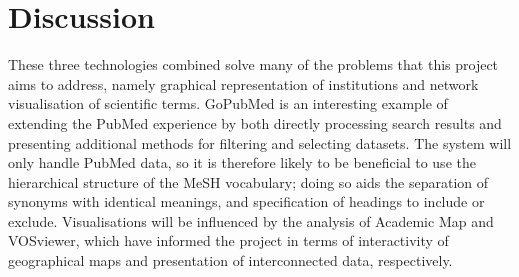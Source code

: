 \documentclass[PROP_AGutteridge_CS.tex]{subfiles}
\begin{document}
\section{Discussion}
These three technologies combined solve many of the problems that this project aims to address, namely graphical representation of institutions and network visualisation of scientific terms. GoPubMed is an interesting example of extending the PubMed experience by both directly processing search results and presenting additional methods for filtering and selecting datasets. The system will only handle PubMed data, so it is therefore likely to be beneficial to use the hierarchical structure of the MeSH vocabulary; doing so aids the separation of synonyms with identical meanings, and specification of headings to include or exclude. Visualisations will be influenced by the analysis of Academic Map and VOSviewer, which have informed the project in terms of interactivity of geographical maps and presentation of interconnected data, respectively. 
\end{document}
